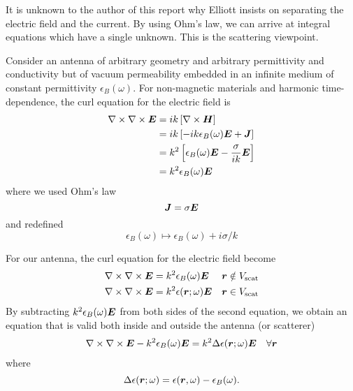 It is unknown to the author of this report why Elliott insists on separating the electric field and the current. 
By using Ohm's law, we can arrive at integral equations which have a single unknown. This is the 
scattering viewpoint. 
  
Consider an antenna of arbitrary geometry and arbitrary
permittivity and conductivity but of  vacuum permeability embedded in an infinite
medium of constant permittivity $\epsilon_B(\omega)$. For non-magnetic materials
and harmonic time-dependence, 
the curl equation for the electric field is 
  \begin{align*}
   \nabla\times\nabla\times\boldsymbol{E}	&=ik\left[\nabla\times\boldsymbol{H}\right]	\\
					&=ik\left[-ik\epsilon_B(\omega)\boldsymbol{E}+\boldsymbol{J}\right]	\\
					&=k^2\left[\epsilon_B(\omega)\boldsymbol{E}-\frac{\sigma}{ik}\boldsymbol{E}\right]	\\
					&=k^2\epsilon_B(\omega)\boldsymbol{E}
  \end{align*}
where we used Ohm's law
  \begin{equation}
   \boldsymbol{J}=\sigma\boldsymbol{E}
  \end{equation}
and redefined 
  \begin{equation}
   \epsilon_B(\omega)\mapsto\epsilon_B(\omega)+i\sigma/k
  \end{equation}

For our antenna, the curl equation for 
the electric field become
  \begin{subequations}
  \begin{align}
   \nabla\times\nabla\times\boldsymbol{E}	&= k^2\epsilon_B(\omega)\boldsymbol{E}		& \boldsymbol{r}\notin V_\text{scat}	\\
   \nabla\times\nabla\times\boldsymbol{E}	&= k^2\epsilon(\boldsymbol{r};\omega)\boldsymbol{E}	& \boldsymbol{r}\in V_\text{scat}
  \end{align}
  \end{subequations}
By subtracting $k^2\epsilon_B(\omega)\boldsymbol{E}$ from both sides of the second equation, 
we obtain an equation that is valid both inside and outside the antenna (or scatterer)
  \begin{align}
   \nabla\times\nabla\times\boldsymbol{E}-k^2\epsilon_B(\omega)\boldsymbol{E}	&= k^2\Delta\epsilon(\boldsymbol{r};\omega)\boldsymbol{E}	&\forall\boldsymbol{r} \label{eq:scattering.integral}
  \end{align}
where 
  \begin{equation}
    \Delta\epsilon(\boldsymbol{r};\omega)=\epsilon(\boldsymbol{r},\omega)-\epsilon_B(\omega).
  \end{equation}


